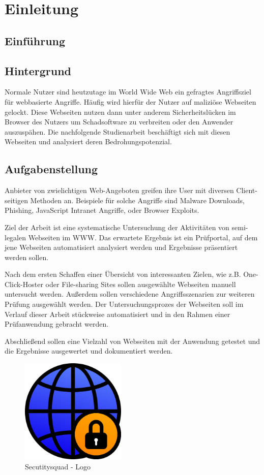 \chapter{Einleitung}

\section{Einführung}


\section{Hintergrund}
Normale Nutzer sind heutzutage im World Wide Web ein gefragtes Angriffsziel für webbasierte Angriffe. Häufig wird hierfür der Nutzer auf maliziöse Webseiten gelockt. Diese Webseiten nutzen dann unter anderem Sicherheitslücken im Browser des Nutzers um Schadsoftware zu verbreiten oder den Anwender auszuspähen. Die nachfolgende Studienarbeit beschäftigt sich mit diesen Webseiten und analysiert deren Bedrohungspotenzial.

\section{Aufgabenstellung}
Anbieter von zwielichtigen Web-Angeboten greifen ihre User mit diversen Client-seitigen Methoden an. Beispiele für solche Angriffe sind Malware Downloads, Phishing, JavaScript Intranet Angriffe, oder Browser Exploits.

Ziel der Arbeit ist eine systematische Untersuchung der Aktivitäten von semi-legalen Webseiten im \ac{WWW}. Das erwartete Ergebnis ist ein Prüfportal, auf dem jene Webseiten automatisiert analysiert werden und Ergebnisse präsentiert werden sollen.

Nach dem ersten Schaffen einer Übersicht von interessanten Zielen, wie z.B. One-Click-Hoster oder File-sharing Sites sollen ausgewählte Webseiten manuell untersucht werden. Außerdem sollen verschiedene Angriffsszenarien zur weiteren Prüfung ausgewählt werden. Der Untersuchungsprozes der Webseiten soll im Verlauf dieser Arbeit stückweise automatisiert und in den Rahmen einer Prüfanwendung gebracht werden.

Abschließend sollen eine Vielzahl von Webseiten mit der Anwendung getestet und die Ergebnisse ausgewertet und dokumentiert werden.

\begin{figure}[H]
	\centering
	\includegraphics[width=5cm]{images/securitysquad}
	\caption{Secutitysquad - Logo}
	\label{fig:securitysquad-logo}
\end{figure}

